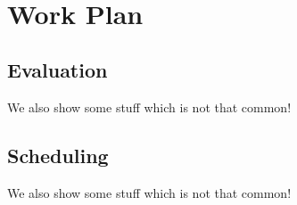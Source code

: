 
%
\   
\chapter{Work Plan}
\label{cha:work_plan}

\glsresetall

\section{Evaluation}
\label{sec:evaluation}

We also show some stuff which is not that common!

\section{Scheduling}
\label{sec:scheduling}

We also show some stuff which is not that common!